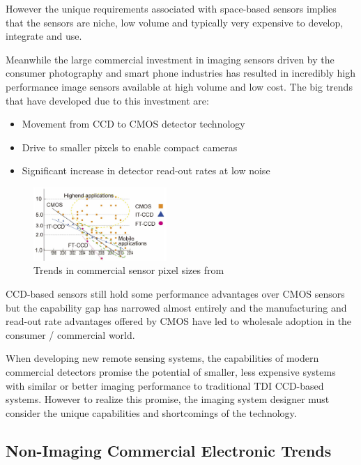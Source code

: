 \documentclass[10pt,journal]{IEEEtran}  %
\begin{document}
However the unique requirements associated with space-based sensors implies that the sensors are niche, low volume and typically very expensive to develop, integrate and use.

Meanwhile the large commercial investment in imaging sensors driven by the consumer photography and smart phone industries has resulted in incredibly high performance image sensors available at high volume and low cost.  The big trends that have developed due to this investment are:

\begin{itemize}
    \item Movement from CCD to CMOS detector technology
    \item Drive to smaller pixels to enable compact cameras
    \item Significant increase in detector read-out rates at low noise
\end{itemize}

\begin{figure}[h!]
\includegraphics[width=0.45\textwidth]{figures/pixel_trend.png}
\caption[]{Trends in commercial sensor pixel sizes from \cite{isscc2016}}
\label{fig:pix_trend}
\end{figure}

CCD-based sensors still hold some performance advantages over CMOS sensors but the capability gap has narrowed almost entirely and the manufacturing and read-out rate advantages offered by CMOS have led to wholesale adoption in the consumer / commercial world.

When developing new remote sensing systems, the capabilities of modern commercial detectors promise the potential of smaller, less expensive systems with similar or better imaging performance to traditional TDI CCD-based systems.  However to realize this promise, the imaging system designer must consider the unique capabilities and shortcomings of the technology.

\subsection{Non-Imaging Commercial Electronic Trends}
\end{document}
